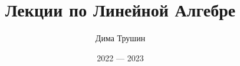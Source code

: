 \documentclass{article}
\begin{document}
\title{Лекции по Линейной Алгебре}
\author{Дима Трушин}
\date{2022 --- 2023}
	
\maketitle
\tableofcontents











\end{document}
